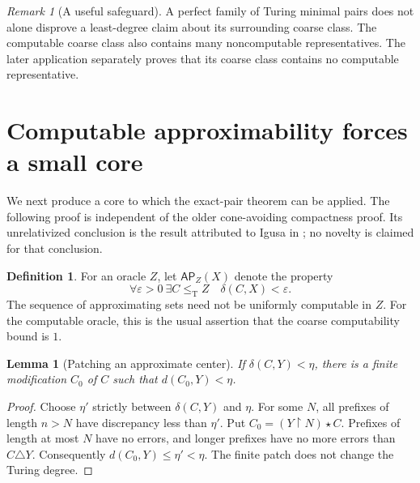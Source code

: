 \documentclass[11pt,a4paper]{article}
\newcommand{\leT}{\leq_{\mathrm T}}
\newcommand{\AP}{\mathsf{AP}}
\newcommand{\patch}{\mathbin\star}
\newcommand{\restr}{\mathbin\upharpoonright}
\newtheorem{lemma}[theorem]{Lemma}
\theoremstyle{definition}\newtheorem{definition}[theorem]{Definition}
\theoremstyle{remark}\newtheorem{remark}[theorem]{Remark}
\begin{document}
\begin{remark}[A useful safeguard]
A perfect family of Turing minimal pairs does not alone disprove a least-degree
claim about its surrounding coarse class. The computable coarse class also
contains many noncomputable representatives. The later application separately
proves that its coarse class contains no computable representative.
\end{remark}

\section{Computable approximability forces a small core}
\label{sec:approximability}
We next produce a core to which the exact-pair theorem can be applied. The
following proof is independent of the older cone-avoiding compactness proof.
Its unrelativized conclusion is the result attributed to Igusa in
\cite[Theorem~4.3]{HJKS}; no novelty is claimed for that conclusion.

\begin{definition}
For an oracle $Z$, let $\AP_Z(X)$ denote the property
\begin{equation}\label{eq:AP}
 \forall\varepsilon>0\ \exists C\leT Z\quad \delta(C,X)<\varepsilon.
\end{equation}
The sequence of approximating sets need not be uniformly computable in $Z$.
For the computable oracle, this is the usual assertion that the coarse
computability bound is $1$.
\end{definition}

\begin{lemma}[Patching an approximate center]\label{lem:approxpatch}
If $\delta(C,Y)<\eta$, there is a finite modification $C_0$ of $C$ such that
$d(C_0,Y)<\eta$.
\end{lemma}
\begin{proof}
Choose $\eta'$ strictly between $\delta(C,Y)$ and $\eta$. For some $N$, all
prefixes of length $n>N$ have discrepancy less than $\eta'$. Put
$C_0=(Y\restr N)\patch C$. Prefixes of length at most $N$ have no errors,
and longer prefixes have no more errors than $C\triangle Y$. Consequently
$d(C_0,Y)\le\eta'<\eta$. The finite patch does not change the Turing degree.
\end{proof}
\end{document}
